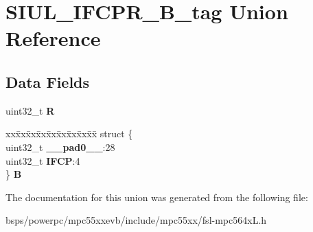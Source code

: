 \hypertarget{unionSIUL__IFCPR__32B__tag}{}\section{S\+I\+U\+L\+\_\+\+I\+F\+C\+P\+R\+\_\+B\+\_\+tag Union Reference}
\label{unionSIUL__IFCPR__32B__tag}
\subsection*{Data Fields}
\begin{DoxyCompactItemize}
\item 
\mbox{\label{unionSIUL__IFCPR__32B__tag_a1b80c10f50841a8b24ad79f2204a0981}} 
uint32\+\_\+t {\bfseries R}
\item 
\mbox{\label{unionSIUL__IFCPR__32B__tag_a91c54ff79c2999e3483d8fc90a428bb8}} 
\begin{tabbing}
xx\=xx\=xx\=xx\=xx\=xx\=xx\=xx\=xx\=\kill
struct \{\\
\>uint32\_t {\bfseries \_\_pad0\_\_}:28\\
\>uint32\_t {\bfseries IFCP}:4\\
\} {\bfseries B}\\

\end{tabbing}\end{DoxyCompactItemize}


The documentation for this union was generated from the following file\+:\begin{DoxyCompactItemize}
\item 
bsps/powerpc/mpc55xxevb/include/mpc55xx/fsl-\/mpc564x\+L.\+h\end{DoxyCompactItemize}
